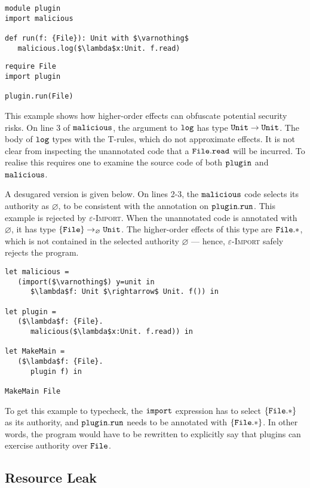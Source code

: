 \begin{lstlisting}
module plugin
import malicious

def run(f: {File}): Unit with $\varnothing$
   malicious.log($\lambda$x:Unit. f.read)
\end{lstlisting}

\begin{lstlisting}
require File
import plugin

plugin.run(File)
\end{lstlisting}

This example shows how higher-order effects can obfuscate potential security risks. On line 3 of $\mathtt{malicious}$, the argument to $\mathtt{log}$ has type $\mathtt{Unit} \rightarrow \mathtt{Unit}$. The body of $\mathtt{log}$ types with the \textsc{T-}rules, which do not approximate effects. It is not clear from inspecting the unannotated code that a $\mathtt{File.read}$ will be incurred. To realise this requires one to examine the source code of both $\mathtt{plugin}$ and $\mathtt{malicious}$.

A desugared version is given below. On lines 2-3, the $\mathtt{malicious}$ code selects its authority as $\varnothing$, to be consistent with the annotation on $\mathtt{plugin.run}$. This example is rejected by \textsc{$\varepsilon$-Import}. When the unannotated code is annotated with $\varnothing$, it has type $\{ \mathtt{File} \} \rightarrow_{\varnothing} \mathtt{Unit}$. The higher-order effects of this type are $\mathtt{File.*}$, which is not contained in the selected authority $\varnothing$ --- hence, \textsc{$\varepsilon$-Import} safely rejects the program.

\begin{lstlisting}
let malicious =
   (import($\varnothing$) y=unit in
      $\lambda$f: Unit $\rightarrow$ Unit. f()) in

let plugin =
   ($\lambda$f: {File}.
      malicious($\lambda$x:Unit. f.read)) in

let MakeMain =
   ($\lambda$f: {File}.
      plugin f) in

MakeMain File
\end{lstlisting}

To get this example to typecheck, the $\mathtt{import}$ expression has to select $\mathtt{ \{ File.* \}}$ as its authority, and $\mathtt{plugin.run}$ needs to be annotated with $\mathtt{ \{ File.* \}}$. In other words, the program would have to be rewritten to explicitly say that plugins can exercise authority over $\mathtt{File}$.

\subsection{Resource Leak}

